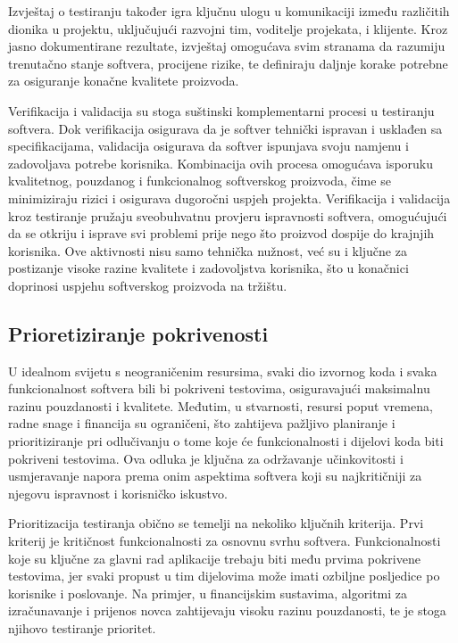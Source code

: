 Izvještaj o testiranju također igra ključnu ulogu u komunikaciji između različitih dionika u projektu, uključujući razvojni tim, voditelje projekata, i klijente.
Kroz jasno dokumentirane rezultate, izvještaj omogućava svim stranama da razumiju trenutačno stanje softvera, procijene rizike, te definiraju daljnje korake potrebne za osiguranje konačne kvalitete proizvoda.

Verifikacija i validacija su stoga suštinski komplementarni procesi u testiranju softvera.
Dok verifikacija osigurava da je softver tehnički ispravan i usklađen sa specifikacijama, validacija osigurava da softver ispunjava svoju namjenu i zadovoljava potrebe korisnika.
Kombinacija ovih procesa omogućava isporuku kvalitetnog, pouzdanog i funkcionalnog softverskog proizvoda, čime se minimiziraju rizici i osigurava dugoročni uspjeh projekta.
Verifikacija i validacija kroz testiranje pružaju sveobuhvatnu provjeru ispravnosti softvera, omogućujući da se otkriju i isprave svi problemi prije nego što proizvod dospije do krajnjih korisnika.
Ove aktivnosti nisu samo tehnička nužnost, već su i ključne za postizanje visoke razine kvalitete i zadovoljstva korisnika, što u konačnici doprinosi uspjehu softverskog proizvoda na tržištu.

\subsection*{Prioretiziranje pokrivenosti}
U idealnom svijetu s neograničenim resursima, svaki dio izvornog koda i svaka funkcionalnost softvera bili bi pokriveni testovima, osiguravajući maksimalnu razinu pouzdanosti i kvalitete.
Međutim, u stvarnosti, resursi poput vremena, radne snage i financija su ograničeni, što zahtijeva pažljivo planiranje i prioritiziranje pri odlučivanju o tome koje će funkcionalnosti i dijelovi koda biti pokriveni testovima.
Ova odluka je ključna za održavanje učinkovitosti i usmjeravanje napora prema onim aspektima softvera koji su najkritičniji za njegovu ispravnost i korisničko iskustvo.

Prioritizacija testiranja obično se temelji na nekoliko ključnih kriterija.
Prvi kriterij je kritičnost funkcionalnosti za osnovnu svrhu softvera.
Funkcionalnosti koje su ključne za glavni rad aplikacije trebaju biti među prvima pokrivene testovima, jer svaki propust u tim dijelovima može imati ozbiljne posljedice po korisnike i poslovanje.
Na primjer, u financijskim sustavima, algoritmi za izračunavanje i prijenos novca zahtijevaju visoku razinu pouzdanosti, te je stoga njihovo testiranje prioritet.

